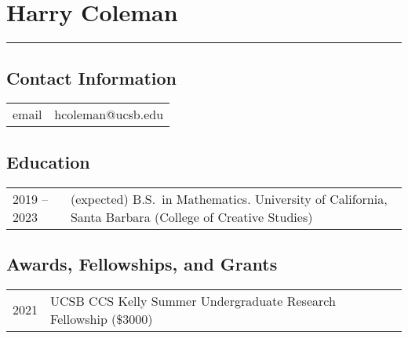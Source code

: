 \documentclass[12pt]{article}
\begin{document}
\section*{Harry Coleman}

\vspace{-\baselineskip}\rule{\textwidth}{0.4pt}\vspace{-\baselineskip}

\subsection*{Contact Information}

\begin{tabularx}{\textwidth}{ll}
    email & hcoleman@ucsb.edu
\end{tabularx}

\subsection*{Education}

\begin{tabularx}{\textwidth}{lX}
    2019 -- 2023 & (expected) B.S.\ in Mathematics. University of California, Santa Barbara (College of Creative Studies) \\
\end{tabularx}

\subsection*{Awards, Fellowships, and Grants}

\begin{tabularx}{\textwidth}{ll}
    2021 & UCSB CCS Kelly Summer Undergraduate Research Fellowship (\$3000)
\end{tabularx}
\end{document}
